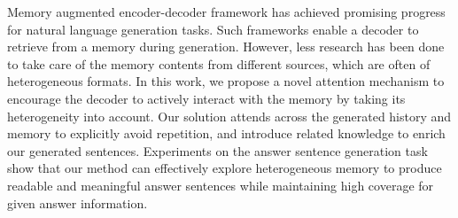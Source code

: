 Memory augmented encoder-decoder framework has achieved promising progress for natural language generation tasks. Such frameworks enable a decoder to retrieve from a memory during generation. However, less research has been done to take care of the memory contents from different sources, which are often of heterogeneous formats. In this work, we propose a novel attention mechanism to encourage the decoder to actively interact with the memory by taking its heterogeneity into account. Our solution attends across the generated history and memory to explicitly avoid repetition, and introduce related knowledge to enrich our generated sentences. Experiments on the answer sentence generation task show that our method can effectively explore heterogeneous memory to produce readable and meaningful answer sentences while maintaining high coverage for given answer information.
